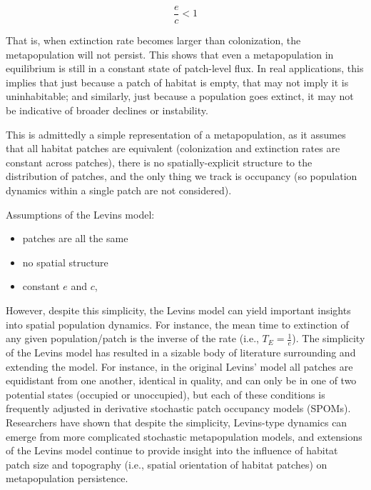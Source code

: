 \documentclass[12pt]{article}
\begin{document}
\begin{equation}
  \frac{e}{c} < 1 
\end{equation}


That is, when extinction rate becomes larger than colonization, the metapopulation will not persist. This shows that even a metapopulation in equilibrium is still in a constant state of patch-level flux. In real applications, this implies that just because a patch of habitat is empty, that may not imply it is uninhabitable; and similarly, just because a population goes extinct, it may not be indicative of broader declines or instability.


This is admittedly a simple representation of a metapopulation, as it assumes that all habitat patches are equivalent (colonization and extinction rates are constant across patches), there is no spatially-explicit structure to the distribution of patches, and the only thing we track is occupancy (so population dynamics within a single patch are not considered). 




Assumptions of the Levins model:
\begin{itemize}
  \item patches are all the same
  \item no spatial structure 
  \item constant $e$ and $c$, 

\end{itemize} 


However, despite this simplicity, the Levins model can yield important insights into spatial population dynamics. For instance, the mean time to extinction of any given population/patch is the inverse of the rate (i.e., $T_E = \frac{1}{e}$). The simplicity of the Levins model has resulted in a sizable body of literature surrounding and extending the model. For instance, in the original Levins' model all patches are equidistant from one another, identical in quality, and can only be in one of two potential states (occupied or unoccupied), but each of these conditions is frequently adjusted in derivative stochastic patch occupancy models (SPOMs). Researchers have shown that despite the simplicity, Levins-type dynamics can emerge from more complicated stochastic metapopulation models, and extensions of the Levins model continue to provide insight into the influence of habitat patch size and topography (i.e., spatial orientation of habitat patches) on metapopulation persistence.
\end{document}
